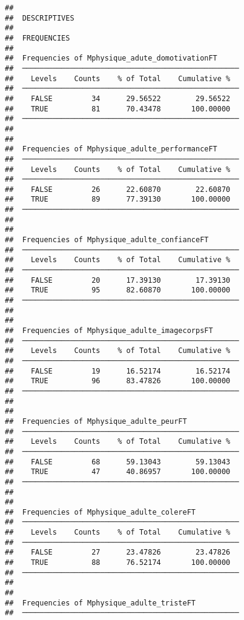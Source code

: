 \documentclass[
]{article}
\begin{document}
\begin{verbatim}
## 
##  DESCRIPTIVES
## 
##  FREQUENCIES
## 
##  Frequencies of Mphysique_adute_domotivationFT      
##  ────────────────────────────────────────────────── 
##    Levels    Counts    % of Total    Cumulative %   
##  ────────────────────────────────────────────────── 
##    FALSE         34      29.56522        29.56522   
##    TRUE          81      70.43478       100.00000   
##  ────────────────────────────────────────────────── 
## 
## 
##  Frequencies of Mphysique_adulte_performanceFT      
##  ────────────────────────────────────────────────── 
##    Levels    Counts    % of Total    Cumulative %   
##  ────────────────────────────────────────────────── 
##    FALSE         26      22.60870        22.60870   
##    TRUE          89      77.39130       100.00000   
##  ────────────────────────────────────────────────── 
## 
## 
##  Frequencies of Mphysique_adulte_confianceFT        
##  ────────────────────────────────────────────────── 
##    Levels    Counts    % of Total    Cumulative %   
##  ────────────────────────────────────────────────── 
##    FALSE         20      17.39130        17.39130   
##    TRUE          95      82.60870       100.00000   
##  ────────────────────────────────────────────────── 
## 
## 
##  Frequencies of Mphysique_adulte_imagecorpsFT       
##  ────────────────────────────────────────────────── 
##    Levels    Counts    % of Total    Cumulative %   
##  ────────────────────────────────────────────────── 
##    FALSE         19      16.52174        16.52174   
##    TRUE          96      83.47826       100.00000   
##  ────────────────────────────────────────────────── 
## 
## 
##  Frequencies of Mphysique_adulte_peurFT             
##  ────────────────────────────────────────────────── 
##    Levels    Counts    % of Total    Cumulative %   
##  ────────────────────────────────────────────────── 
##    FALSE         68      59.13043        59.13043   
##    TRUE          47      40.86957       100.00000   
##  ────────────────────────────────────────────────── 
## 
## 
##  Frequencies of Mphysique_adulte_colereFT           
##  ────────────────────────────────────────────────── 
##    Levels    Counts    % of Total    Cumulative %   
##  ────────────────────────────────────────────────── 
##    FALSE         27      23.47826        23.47826   
##    TRUE          88      76.52174       100.00000   
##  ────────────────────────────────────────────────── 
## 
## 
##  Frequencies of Mphysique_adulte_tristeFT           
##  ────────────────────────────────────────────────── 

\end{verbatim}
\end{document}
